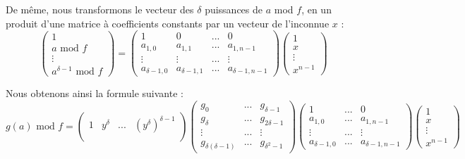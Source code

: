 \documentclass[a4paper]{article}
\begin{document}
De même, nous transformons le vecteur des $\delta$ puissances de $a$ mod $f$, en un produit d'une matrice à coefficients constants par un vecteur de l'inconnue $x$ :
\[
    \begin{pmatrix}
        1 \\
        a \text{ mod }f\\
        \vdots \\
        a^{\delta-1} \text{ mod }f
    \end{pmatrix}
    =
    \begin{pmatrix}
        1 & 0 & ... & 0 \\
        a_{1,0} & a_{1,1} & ... & a_{1,n-1} \\
        \vdots & \vdots & ... & \vdots \\
        a_{\delta-1,0} & a_{\delta-1,1} & ... & a_{\delta-1,n-1}
    \end{pmatrix}
    \begin{pmatrix}
        1 \\
        x \\
        \vdots \\
        x^{n-1}
    \end{pmatrix}
\]

Nous obtenons ainsi la formule suivante :
\[
g(a)\text{ mod }f =
\begin{pmatrix}
    1 & y^\delta & ... & (y^\delta)^{\delta-1}  \\  
\end{pmatrix}
\begin{pmatrix}
    g_0 & ... & g_{\delta-1} \\
    g_{\delta} & ... & g_{2\delta-1} \\
    \vdots & ... & \vdots \\
    g_{\delta(\delta-1)} & ... & g_{\delta^2-1}
\end{pmatrix}
\begin{pmatrix}
    1 &  ... & 0 \\
    a_{1,0} & ... & a_{1,n-1} \\
    \vdots &  ... & \vdots \\
    a_{\delta-1,0} & ... & a_{\delta-1,n-1}
\end{pmatrix}
\begin{pmatrix}
    1 \\
    x \\
    \vdots \\
    x^{n-1}
\end{pmatrix}
\]
\end{document}
